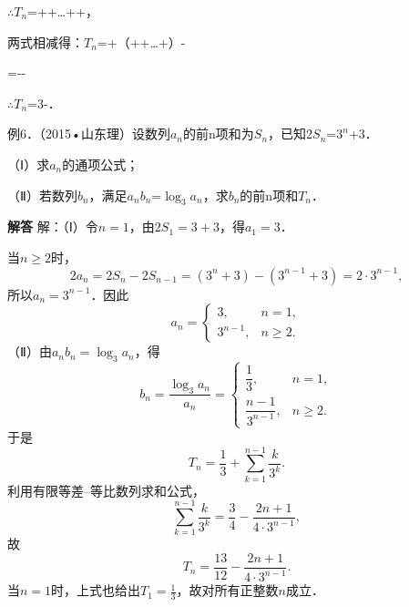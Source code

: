 \ensuremath{\therefore}\ensuremath{T_{n}}=++\ldots{}++，\par
两式相减得：\ensuremath{T_{n}}=+（++\ldots{}+）-\par
=--\par
\ensuremath{\therefore}\ensuremath{T_{n}}=3-．\par
\par\endgroup\fi

例6．（2015•山东理）设数列{\ensuremath{a_{n}}}的前n项和为\ensuremath{S_{n}}，已知2\ensuremath{S_{n}}=\ensuremath{3^{n}}+3．\par
（Ⅰ）求{\ensuremath{a_{n}}}的通项公式；\par
（Ⅱ）若数列{\ensuremath{b_{n}}}，满足\ensuremath{a_{n}}\ensuremath{b_{n}}=\ensuremath{\log_{3}}\ensuremath{a_{n}}，求{\ensuremath{b_{n}}}的前n项和\ensuremath{T_{n}}．\par
\QuestionSpace{4.8cm}
\ifshowanswers
\par\begingroup\color{solutioncolor}\noindent\textbf{解答}\quad
解：（Ⅰ）令$n=1$，由$2S_1=3+3$，得$a_1=3$．\par
当$n\geq2$时，
\[
2a_n=2S_n-2S_{n-1}
=\left(3^n+3\right)-\left(3^{n-1}+3\right)
=2\cdot3^{n-1},
\]
所以$a_n=3^{n-1}$．因此
\[
\boxed{a_n=\begin{cases}3,&n=1,\\3^{n-1},&n\geq2.\end{cases}}
\]
（Ⅱ）由$a_nb_n=\log_3a_n$，得
\[
b_n=\frac{\log_3a_n}{a_n}
=\begin{cases}\dfrac13,&n=1,\\[3pt]\dfrac{n-1}{3^{n-1}},&n\geq2.\end{cases}
\]
于是
\[
T_n=\frac13+\sum_{k=1}^{n-1}\frac{k}{3^k}.
\]
利用有限等差--等比数列求和公式，
\[
\sum_{k=1}^{n-1}\frac{k}{3^k}
=\frac34-\frac{2n+1}{4\cdot3^{n-1}},
\]
故
\[
\boxed{T_n=\frac{13}{12}-\frac{2n+1}{4\cdot3^{n-1}}}.
\]
当$n=1$时，上式也给出$T_1=\frac13$，故对所有正整数$n$成立．\par
\par\endgroup\fi


